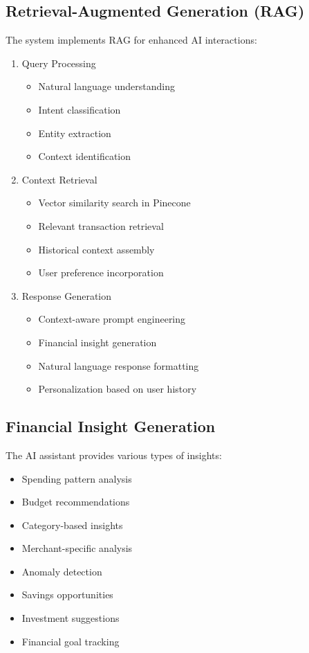 \documentclass[conference]{IEEEtran}
\begin{document}
\subsection{Retrieval-Augmented Generation (RAG)}
The system implements RAG for enhanced AI interactions:
\begin{enumerate}
\item Query Processing
\begin{itemize}
\item Natural language understanding
\item Intent classification
\item Entity extraction
\item Context identification
\end{itemize}

\item Context Retrieval
\begin{itemize}
\item Vector similarity search in Pinecone
\item Relevant transaction retrieval
\item Historical context assembly
\item User preference incorporation
\end{itemize}

\item Response Generation
\begin{itemize}
\item Context-aware prompt engineering
\item Financial insight generation
\item Natural language response formatting
\item Personalization based on user history
\end{itemize}
\end{enumerate}

\subsection{Financial Insight Generation}
The AI assistant provides various types of insights:
\begin{itemize}
\item Spending pattern analysis
\item Budget recommendations
\item Category-based insights
\item Merchant-specific analysis
\item Anomaly detection
\item Savings opportunities
\item Investment suggestions
\item Financial goal tracking
\end{itemize}
\end{document}
